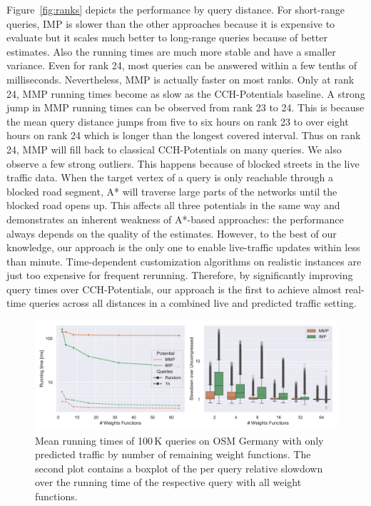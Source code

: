 \documentclass[a4paper,UKenglish,cleveref, autoref, thm-restate,anonymous]{lipics-v2021}
\begin{document}
Figure~\ref{fig:ranks} depicts the performance by query distance.
For short-range queries, IMP is slower than the other approaches because it is expensive to evaluate but it scales much better to long-range queries because of better estimates.
Also the running times are much more stable and have a smaller variance.
Even for rank 24, most queries can be answered within a few tenths of milliseconds.
Nevertheless, MMP is actually faster on most ranks.
Only at rank 24, MMP running times become as slow as the CCH-Potentials baseline.
A strong jump in MMP running times can be observed from rank 23 to 24.
This is because the mean query distance jumps from five to six hours on rank 23 to over eight hours on rank 24 which is longer than the longest covered interval.
Thus on rank 24, MMP will fill back to classical CCH-Potentials on many queries.
We also observe a few strong outliers.
This happens because of blocked streets in the live traffic data.
When the target vertex of a query is only reachable through a blocked road segment, A* will traverse large parts of the networks until the blocked road opens up.
This affects all three potentials in the same way and demonstrates an inherent weakness of A*-based approaches: the performance always depends on the quality of the estimates.
However, to the best of our knowledge, our approach is the only one to enable live-traffic updates within less than minute.
Time-dependent customization algorithms on realistic instances are just too expensive for frequent rerunning.
Therefore, by significantly improving query times over CCH-Potentials, our approach is the first to achieve almost real-time queries across all distances in a combined live and predicted traffic setting. %

\begin{figure}[!t]
\centering
\includegraphics[width=\linewidth]{fig/compression.pdf}
\caption{
Mean running times of 100\,K queries on OSM Germany with only predicted traffic by number of remaining weight functions.
The second plot contains a boxplot of the per query relative slowdown over the running time of the respective query with all weight functions.
}\label{fig:compression}
\end{figure}
\end{document}
